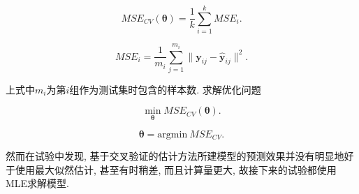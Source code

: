                 \begin{equation}
                    MSE_{CV}(\boldsymbol{\theta})=\frac{1}{k}\sum^{k}_{i=1}MSE_{i}.
                \end{equation}

                \begin{equation}
                    MSE_{i}=\frac{1}{m_{i}} \sum^{m_{i}}_{j=1}\|\boldsymbol{y}_{ij}-\boldsymbol{\hat{y}}_{ij}\|^{2}.
                \end{equation}

                上式中$m_{i}$为第$i$组作为测试集时包含的样本数. 求解优化问题

                \begin{equation}
                    \min_{\boldsymbol{\theta}} MSE_{CV}(\boldsymbol{\theta}).
                \end{equation}
                

                \begin{equation}
                    \boldsymbol{\theta}=\mathrm{argmin}\ MSE_{CV}.
                \end{equation}

            然而在试验中发现, 基于交叉验证的估计方法所建模型的预测效果并没有明显地好于使用最大似然估计, 甚至有时稍差, 而且计算量更大, 故接下来的试验都使用MLE求解模型.











